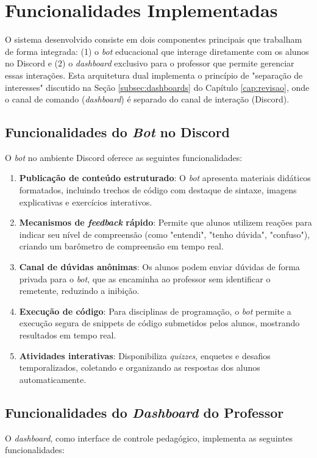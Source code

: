 \section{Funcionalidades Implementadas}
\label{sec:funcionalidades}

O sistema desenvolvido consiste em dois componentes principais que trabalham de
forma integrada: (1) o \textit{bot} educacional que interage diretamente com os
alunos no Discord e (2) o \textit{dashboard} exclusivo para o professor que
permite gerenciar essas interações. Esta arquitetura dual implementa o princípio
de "separação de interesses" discutido na Seção \ref{subsec:dashboards} do
Capítulo \ref{cap:revisao}, onde o canal de comando (\textit{dashboard}) é
separado do canal de interação (Discord).

\subsection{Funcionalidades do \textit{Bot} no Discord}
O \textit{bot} no ambiente Discord oferece as seguintes funcionalidades:

\begin{enumerate}
\item \textbf{Publicação de conteúdo estruturado}: O \textit{bot} apresenta
materiais didáticos formatados, incluindo trechos de código com destaque de
sintaxe, imagens explicativas e exercícios interativos.
\item \textbf{Mecanismos de \textit{feedback} rápido}: Permite que alunos
utilizem reações para indicar seu nível de compreensão (como "entendi", "tenho
dúvida", "confuso"), criando um barômetro de compreensão em tempo real.
\item \textbf{Canal de dúvidas anônimas}: Os alunos podem enviar dúvidas de
forma privada para o \textit{bot}, que as encaminha ao professor sem identificar
o remetente, reduzindo a inibição.
\item \textbf{Execução de código}: Para disciplinas de programação, o
\textit{bot} permite a execução segura de snippets de código submetidos pelos
alunos, mostrando resultados em tempo real.
\item \textbf{Atividades interativas}: Disponibiliza \textit{quizzes}, enquetes
e desafios temporalizados, coletando e organizando as respostas dos alunos
automaticamente.
\end{enumerate}

\subsection{Funcionalidades do \textit{Dashboard} do Professor}
O \textit{dashboard}, como interface de controle pedagógico, implementa as
seguintes funcionalidades:

